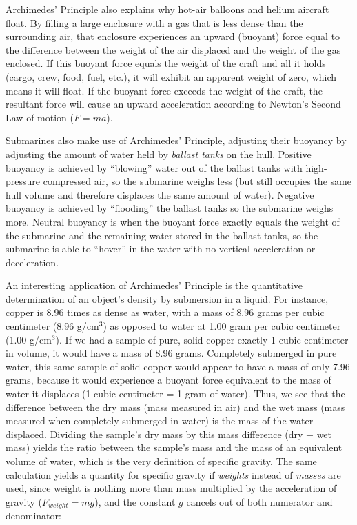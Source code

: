 \vskip 10pt

Archimedes' Principle also explains why hot-air balloons and helium aircraft float.  By filling a large enclosure with a gas that is less dense than the surrounding air, that enclosure experiences an upward (buoyant) force equal to the difference between the weight of the air displaced and the weight of the gas enclosed.  If this buoyant force equals the weight of the craft and all it holds (cargo, crew, food, fuel, etc.), it will exhibit an apparent weight of zero, which means it will float.  If the buoyant force exceeds the weight of the craft, the resultant force will cause an upward acceleration according to Newton's Second Law of motion ($F = ma$). 

Submarines also make use of Archimedes' Principle, adjusting their buoyancy by adjusting the amount of water held by \textit{ballast tanks} on the hull.  Positive buoyancy is achieved by ``blowing'' water out of the ballast tanks with high-pressure compressed air, so the submarine weighs less (but still occupies the same hull volume and therefore displaces the same amount of water).  Negative buoyancy is achieved by ``flooding'' the ballast tanks so the submarine weighs more.  Neutral buoyancy is when the buoyant force exactly equals the weight of the submarine and the remaining water stored in the ballast tanks, so the submarine is able to ``hover'' in the water with no vertical acceleration or deceleration.

\vskip 10pt

An interesting application of Archimedes' Principle is the quantitative determination of an object's density by submersion in a liquid.  For instance, copper is 8.96 times as dense as water, with a mass of 8.96 grams per cubic centimeter (8.96 g/cm$^{3}$) as opposed to water at 1.00 gram per cubic centimeter (1.00 g/cm$^{3}$).  If we had a sample of pure, solid copper exactly 1 cubic centimeter in volume, it would have a mass of 8.96 grams.  Completely submerged in pure water, this same sample of solid copper would appear to have a mass of only 7.96 grams, because it would experience a buoyant force equivalent to the mass of water it displaces (1 cubic centimeter = 1 gram of water).  Thus, we see that the difference between the dry mass (mass measured in air) and the wet mass (mass measured when completely submerged in water) is the mass of the water displaced.  Dividing the sample's dry mass by this mass difference (dry $-$ wet mass) yields the ratio between the sample's mass and the mass of an equivalent volume of water, which is the very definition of specific gravity.  The same calculation yields a quantity for specific gravity if \textit{weights} instead of \textit{masses} are used, since weight is nothing more than mass multiplied by the acceleration of gravity ($F_{weight} = mg$), and the constant $g$ cancels out of both numerator and denominator:   

